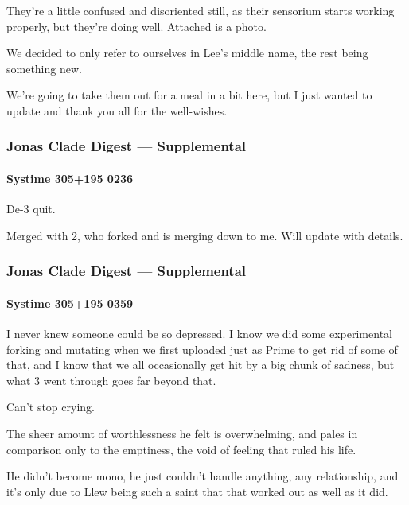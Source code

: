 They're a little confused and disoriented still, as their sensorium starts working properly, but they're doing well. Attached is a photo.

We decided to only refer to ourselves in Lee's middle name, the rest being something new.

We're going to take them out for a meal in a bit here, but I just wanted to update and thank you all for the well-wishes.

\hypertarget{jonas-clade-digest-supplemental-2}{%
\subsubsection{Jonas Clade Digest --- Supplemental}\label{jonas-clade-digest-supplemental-2}}

\hypertarget{systime-305195-0236}{%
\paragraph{Systime 305+195 0236}\label{systime-305195-0236}}

De-3 quit.

Merged with 2, who forked and is merging down to me. Will update with details.

\hypertarget{jonas-clade-digest-supplemental-3}{%
\subsubsection{Jonas Clade Digest --- Supplemental}\label{jonas-clade-digest-supplemental-3}}

\hypertarget{systime-305195-0359}{%
\paragraph{Systime 305+195 0359}\label{systime-305195-0359}}

I never knew someone could be so depressed. I know we did some experimental forking and mutating when we first uploaded just as Prime to get rid of some of that, and I know that we all occasionally get hit by a big chunk of sadness, but what 3 went through goes far beyond that.

Can't stop crying.

The sheer amount of worthlessness he felt is overwhelming, and pales in comparison only to the emptiness, the void of feeling that ruled his life.

He didn't become mono, he just couldn't handle anything, any relationship, and it's only due to Llew being such a saint that that worked out as well as it did.

